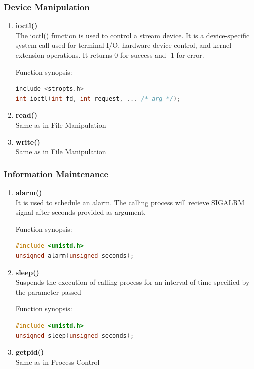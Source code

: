 \subsubsection{Device Manipulation}
\begin{enumerate}
	\item \textbf{ioctl()} \\
	The ioctl() function is used to control a stream device. It is a device-specific system call 
	used for terminal I/O, hardware device control, and kernel extension operations. It returns 0
	for success and -1 for error.

	Function synopsis:
	\begin{lstlisting}[language=C]
include <stropts.h>
int ioctl(int fd, int request, ... /* arg */); 
	\end{lstlisting}

	\item \textbf{read()} \\
	Same as in File Manipulation

	\item \textbf{write()} \\
	Same as in File Manipulation
\end{enumerate}


\subsubsection{Information Maintenance}
\begin{enumerate}
	\item \textbf{alarm()} \\
	It is used to schedule an alarm. The calling process will recieve
	SIGALRM signal after seconds provided as argument.

	Function synopsis:
	\begin{lstlisting}[language=C]
#include <unistd.h>
unsigned alarm(unsigned seconds);
	\end{lstlisting}

	\item \textbf{sleep()} \\
	Suspends the execution of calling process for an interval of time specified
	by the parameter passed

	Function synopsis:
	\begin{lstlisting}[language=C]
#include <unistd.h>
unsigned sleep(unsigned seconds);
	\end{lstlisting}

	\item \textbf{getpid()} \\
	Same as in Process Control
\end{enumerate}


